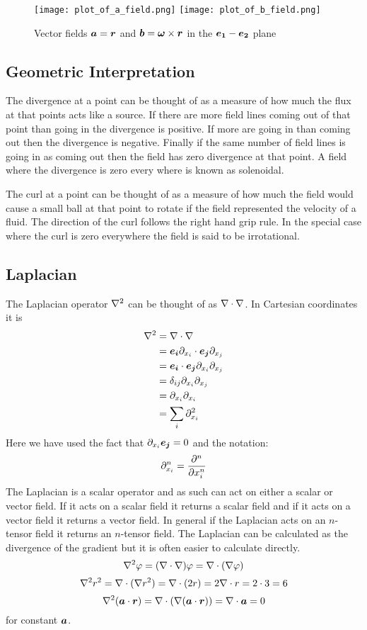 \documentclass{article}
\newcommand{\pdvx}[1]{\partial_{x_{#1}}}
\begin{document}
    \begin{figure}[ht]
        \centering
        \texttt{[image: plot\_of\_a\_field.png]}
        \texttt{[image: plot\_of\_b\_field.png]}
        \caption{Vector fields \(\bm{a} = \bm{r}\) and \(\bm{b} = \bm{\omega}\times\bm{r}\) in the \(\bm{e_{1}}-\bm{e_{2}}\) plane}
        \label{fig:vector fields a and b}
    \end{figure}
    \subsection{Geometric Interpretation}
    The divergence at a point can be thought of as a measure of how much the flux at that points acts like a source.
    If there are more field lines coming out of that point than going in the divergence is positive.
    If more are going in than coming out then the divergence is negative.
    Finally if the same number of field lines is going in as coming out then the field has zero divergence at that point.
    A field where the divergence is zero every where is known as solenoidal.
    
    The curl at a point can be thought of as a measure of how much the field would cause a small ball at that point to rotate if the field represented the velocity of a fluid.
    The direction of the curl follows the right hand grip rule.
    In the special case where the curl is zero everywhere the field is said to be irrotational.
    
    \subsection{Laplacian}
    The Laplacian operator \(\laplacian\) can be thought of as \(\nabla\cdot\nabla\).
    In Cartesian coordinates it is
    \begin{align*}
        \laplacian &= \div\grad\\
        &= \ve i\pdvx i\cdot \ve j\pdvx j\\
        &= \ve i\cdot\ve j\pdvx i\pdvx j\\
        &= \delta_{ij}\pdvx i\pdvx j\\
        &= \pdvx i\pdvx i\\
        &= \sum_i \pdvx i^2
    \end{align*}
    Here we have used the fact that \(\pdvx i\ve j = 0\) and the notation:
    \[\pdvx i^n = \pdv[n]{x_i}\]
    The Laplacian is a scalar operator and as such can act on either a scalar or vector field.
    If it acts on a scalar field it returns a scalar field and if it acts on a vector field it returns a vector field.
    In general if the Laplacian acts on an \(n\)-tensor field it returns an \(n\)-tensor field.
    The Laplacian can be calculated as the divergence of the gradient but it is often easier to calculate directly.
    \[\laplacian\varphi = (\grad\cdot\grad)\varphi = \div(\grad\varphi)\]
    \example
    \[\laplacian r^2 = \div(\grad r^2) = \div(2r) = 2\div r = 2\cdot 3 = 6\]
    \[\laplacian(\vv a\cdot\vv r) = \div(\grad(\vv a\cdot\vv r)) = \div\vv a = 0\]
    for constant \(\bm{a}\).
    
\end{document}
